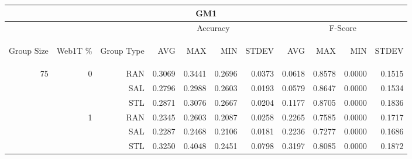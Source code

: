 \begin{center}
\begin{table}[htbp] 
 \begin{center}
\begin{tabular}{ | r | r | r | r | r | r | r | r | r | r | r |}
\hline
\multicolumn{11}{|c|}{GM1}\\
\hline
 & & & \multicolumn{4}{|c|}{Accuracy} & \multicolumn{4}{|c|}{F-Score}\\ \cline{4-11}
\begin{sideways}Group Size\end{sideways} & \begin{sideways}Web1T \%\end{sideways} & \begin{sideways}Group Type\end{sideways} & \begin{sideways}AVG\end{sideways} & \begin{sideways}MAX\end{sideways} & \begin{sideways}MIN\end{sideways} & \begin{sideways}STDEV\end{sideways} & \begin{sideways}AVG\end{sideways} & \begin{sideways}MAX\end{sideways} & \begin{sideways}MIN\end{sideways} & \begin{sideways}STDEV\end{sideways}\\
\hline
\multirow{18}{*}{75}
 & \multirow{3}{*}{0} & RAN & 0.3069 & 0.3441 & 0.2696 & 0.0373 & 0.0618 & 0.8578 & 0.0000 & 0.1515\\ \cline{3-11}
 &   & SAL & 0.2796 & 0.2988 & 0.2603 & 0.0193 & 0.0579 & 0.8647 & 0.0000 & 0.1534\\ \cline{3-11}
 &   & STL & 0.2871 & 0.3076 & 0.2667 & 0.0204 & 0.1177 & 0.8705 & 0.0000 & 0.1836\\ \cline{2-11}
 & \multirow{3}{*}{1} & RAN & 0.2345 & 0.2603 & 0.2087 & 0.0258 & 0.2265 & 0.7585 & 0.0000 & 0.1717\\ \cline{3-11}
 &   & SAL & 0.2287 & 0.2468 & 0.2106 & 0.0181 & 0.2236 & 0.7277 & 0.0000 & 0.1686\\ \cline{3-11}
 &   & STL & 0.3250 & 0.4048 & 0.2451 & 0.0798 & 0.3197 & 0.8085 & 0.0000 & 0.1872\\ \cline{2-11}

\end{tabular}
\end{center}
\end{table}
\end{center}
